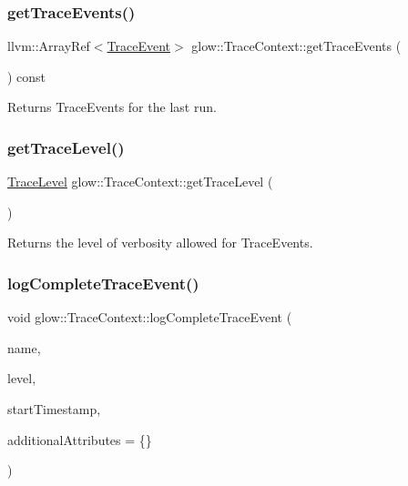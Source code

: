 \subsubsection{\texorpdfstring{get\+Trace\+Events()}{getTraceEvents()}\hspace{0.1cm}{\footnotesize\ttfamily [2/2]}}
{\footnotesize\ttfamily llvm\+::\+Array\+Ref$<$\hyperlink{structglow_1_1_trace_event}{Trace\+Event}$>$ glow\+::\+Trace\+Context\+::get\+Trace\+Events (\begin{DoxyParamCaption}{ }\end{DoxyParamCaption}) const\hspace{0.3cm}{\ttfamily [inline]}}

\begin{DoxyReturn}{Returns}
Trace\+Events for the last run. 
\end{DoxyReturn}
\mbox{\label{classglow_1_1_trace_context_aa1f486de9cc4c4d535900eb6054b8634}} 
\subsubsection{\texorpdfstring{get\+Trace\+Level()}{getTraceLevel()}}
{\footnotesize\ttfamily \hyperlink{structglow_1_1_trace_event_a10132a384d74408a112510cbe1b7d978}{Trace\+Level} glow\+::\+Trace\+Context\+::get\+Trace\+Level (\begin{DoxyParamCaption}{ }\end{DoxyParamCaption})\hspace{0.3cm}{\ttfamily [inline]}}

\begin{DoxyReturn}{Returns}
the level of verbosity allowed for Trace\+Events. 
\end{DoxyReturn}
\mbox{\label{classglow_1_1_trace_context_aac75f25ff3479645e161d5c13c34ff34}} 
\subsubsection{\texorpdfstring{log\+Complete\+Trace\+Event()}{logCompleteTraceEvent()}}
{\footnotesize\ttfamily void glow\+::\+Trace\+Context\+::log\+Complete\+Trace\+Event (\begin{DoxyParamCaption}\item[{llvm\+::\+String\+Ref}]{name,  }\item[{\hyperlink{structglow_1_1_trace_event_a10132a384d74408a112510cbe1b7d978}{Trace\+Level}}]{level,  }\item[{uint64\+\_\+t}]{start\+Timestamp,  }\item[{std\+::map$<$ std\+::string, std\+::string $>$}]{additional\+Attributes = {\ttfamily \{\}} }\end{DoxyParamCaption})}

